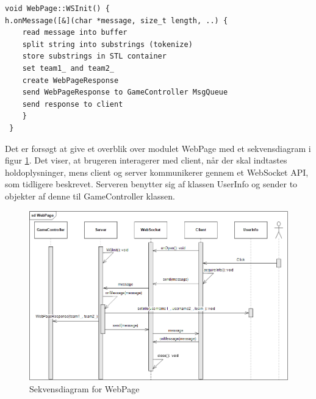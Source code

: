\documentclass[Softwaredesign/Softwaredesign_main.tex]{subfiles}
\begin{document}
\newpage
\begin{lstlisting}
void WebPage::WSInit() {
h.onMessage([&](char *message, size_t length, ..) {
    read message into buffer
    split string into substrings (tokenize)
    store substrings in STL container
    set team1_ and team2_
    create WebPageResponse
    send WebPageResponse to GameController MsgQueue
    send response to client
    }
 }
\end{lstlisting}
Det er forsøgt at give et overblik over modulet WebPage med et sekvensdiagram i figur \ref{fig:WebPage_sd}. Det viser, at brugeren interagerer med client, når der skal indtastes holdoplysninger, mens client og server kommunikerer gennem et WebSocket API, som tidligere beskrevet. Serveren benytter sig af klassen UserInfo og sender to objekter af denne til GameController klassen.  
\begin{figure}[H]
    \centering
    \includegraphics[width=1\textwidth]{Softwaredesign/RPiApp/graphic_RPi/WebPage_sd_2.png}
    \caption{Sekvensdiagram for WebPage}
    \label{fig:WebPage_sd}
\end{figure}




\end{document}
